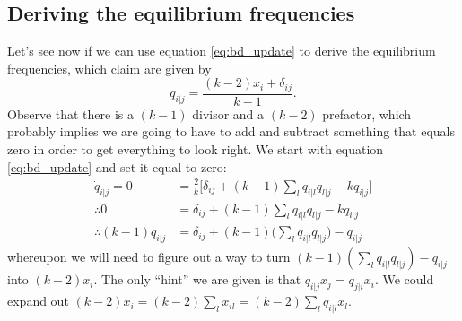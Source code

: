 \documentclass[13pt, justified]{tufte-handout}
\begin{document}
\subsection{Deriving the equilibrium frequencies}

Let's see now if we can use equation \ref{eq:bd_update} to derive the equilibrium frequencies, which \citet{ohtsuki.nowak_2006} claim are given by
\begin{equation}
    q_{i|j} = \frac{(k-2)x_i + \delta_{ij}}{k-1}.
\end{equation}
Observe that there is a $(k-1)$ divisor and a $(k-2)$ prefactor, which probably implies we are going to have to add and subtract something that equals zero in order to get everything to look right.
We start with equation \ref{eq:bd_update} and set it equal to zero:
\begin{equation}
    \begin{split}
        \dot{q}_{i|j} = 0 & = \frac{2}{k} \Big[ \delta_{ij} + (k-1)\sum_l q_{i|l}q_{l|j} - kq_{i|j} \Big] \nonumber \\
        \therefore 0 & = \delta_{ij} + (k-1)\sum_l q_{i|l}q_{l|j} - kq_{i|j} \nonumber \\
        \therefore (k-1)q_{i|j} & = \delta_{ij} + (k-1)\Big( \sum_l q_{i|l}q_{l|j} \Big) - q_{i|j} \nonumber
    \end{split}
\end{equation}
whereupon we will need to figure out a way to turn $(k-1)(\sum_l q_{i|l}q_{l|j}) - q_{i|j}$ into $(k-2)x_i$.
The only ``hint'' we are given is that $q_{i|j}x_j = q_{j|i}x_i$.
We could expand out $(k-2)x_i = (k-2)\sum_l x_{il} = (k-2)\sum_l q_{i|l} x_l$.




\end{document}
